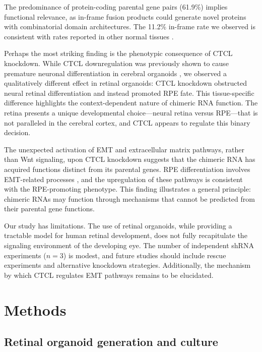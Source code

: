 \documentclass[11pt]{article}
\begin{document}
The predominance of protein-coding parental gene pairs (61.9\%) implies functional relevance, as in-frame fusion products could generate novel proteins with combinatorial domain architectures. The 11.2\% in-frame rate we observed is consistent with rates reported in other normal tissues \citep{li2019chimeric}.

Perhaps the most striking finding is the phenotypic consequence of CTCL knockdown. While CTCL downregulation was previously shown to cause premature neuronal differentiation in cerebral organoids \citep{gao2022ctcl}, we observed a qualitatively different effect in retinal organoids: CTCL knockdown obstructed neural retinal differentiation and instead promoted RPE fate. This tissue-specific difference highlights the context-dependent nature of chimeric RNA function. The retina presents a unique developmental choice---neural retina versus RPE---that is not paralleled in the cerebral cortex, and CTCL appears to regulate this binary decision.

The unexpected activation of EMT and extracellular matrix pathways, rather than Wnt signaling, upon CTCL knockdown suggests that the chimeric RNA has acquired functions distinct from its parental genes. RPE differentiation involves EMT-related processes \citep{thomas2019emt, fuhrmann2014rpe}, and the upregulation of these pathways is consistent with the RPE-promoting phenotype. This finding illustrates a general principle: chimeric RNAs may function through mechanisms that cannot be predicted from their parental gene functions.

Our study has limitations. The use of retinal organoids, while providing a tractable model for human retinal development, does not fully recapitulate the signaling environment of the developing eye. The number of independent shRNA experiments ($n = 3$) is modest, and future studies should include rescue experiments and alternative knockdown strategies. Additionally, the mechanism by which CTCL regulates EMT pathways remains to be elucidated.

\section{Methods}

\subsection{Retinal organoid generation and culture}
\end{document}
